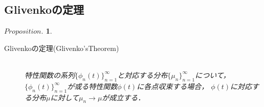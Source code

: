 \documentclass[a4j,papersize,disablejfam,slide,14pt]{jsarticle}
\newtheorem{Prop}{$Proposition.$}
\begin{document}
\subsection{{\rm Glivenko}の定理}
	\begin{screen}
    	\begin{Prop}
        	\begin{description}
            	\item[{\rm Glivenko}の定理({\rm Glivenko's\quad Theorem})]\mbox{}\\
					特性関数の系列$\{ \phi_n(t) \}_{n=1}^{\infty}$と対応する分布$\{ \mu_n \}_{n=1}^{\infty}$について，
                    $\{ \phi_n(t) \}_{n=1}^{\infty}$が或る特性関数$\phi(t)$に各点収束する場合，
    				$\phi(t)$に対応する分布$\mu$に対して$\mu_n \to \mu$が成立する．
            \end{description}
        \end{Prop}
    \end{screen}
\end{document}
